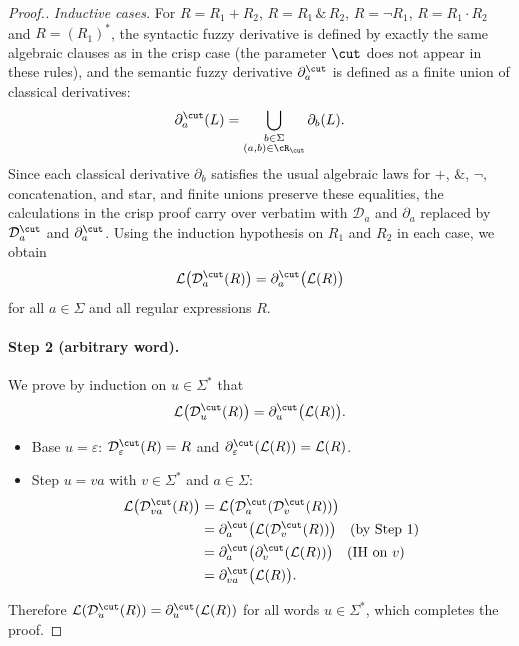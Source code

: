 \begin{proof}[Proof.]
\smallskip
\noindent\emph{Inductive cases.}
For $R = R_1 + R_2$, $R = R_1 \,\&\, R_2$, $R = \neg R_1$, $R = R_1\cdot R_2$ and
$R = (R_1)^*$, the syntactic fuzzy derivative is defined by exactly the same
algebraic clauses as in the crisp case (the parameter $\cut$ does not appear
in these rules), and the semantic fuzzy derivative $\partial^\cut_a$ is defined
as a finite union of classical derivatives:
\[
  \partial^\cut_a(L)
  = \bigcup_{\substack{b \in \Sigma \\ (a,b)\in\cR_\cut}} \partial_b(L).
\]
Since each classical derivative $\partial_b$ satisfies the usual algebraic
laws for $+$, $\&$, $\neg$, concatenation, and star, and finite unions preserve
these equalities, the calculations in the crisp proof carry over verbatim with
$\mathcal{D}_a$ and $\partial_a$ replaced by $\mathcal{D}^\cut_a$ and
$\partial^\cut_a$. Using the induction hypothesis on $R_1$ and $R_2$ in each
case, we obtain
\[
  \mathcal{L}\bigl(\mathcal{D}^\cut_a(R)\bigr)
  = \partial^\cut_a\bigl(\mathcal{L}(R)\bigr)
\]
for all $a \in \Sigma$ and all regular expressions $R$.

\paragraph{Step 2 (arbitrary word).}
We prove by induction on $u \in \Sigma^*$ that
\[
  \mathcal{L}\bigl(\mathcal{D}^\cut_u(R)\bigr)
  = \partial^\cut_u\bigl(\mathcal{L}(R)\bigr).
\]
\begin{itemize}
  \item Base $u=\varepsilon$:
    $\mathcal{D}^\cut_\varepsilon(R)=R$ and
    $\partial^\cut_\varepsilon(\mathcal{L}(R))=\mathcal{L}(R)$.
  \item Step $u = va$ with $v \in \Sigma^*$ and $a \in \Sigma$:
    \[
      \begin{aligned}
      \mathcal{L}\bigl(\mathcal{D}^\cut_{va}(R)\bigr)
      &= \mathcal{L}\bigl(\mathcal{D}^\cut_a(\mathcal{D}^\cut_v(R))\bigr) \\
      &= \partial^\cut_a\bigl(\mathcal{L}(\mathcal{D}^\cut_v(R))\bigr)
           \quad\text{(by Step 1)} \\
      &= \partial^\cut_a\bigl(\partial^\cut_v(\mathcal{L}(R))\bigr)
           \quad\text{(IH on $v$)} \\
      &= \partial^\cut_{va}\bigl(\mathcal{L}(R)\bigr).
      \end{aligned}
    \]
\end{itemize}
Therefore $\mathcal{L}(\mathcal{D}^\cut_u(R))=\partial^\cut_u(\mathcal{L}(R))$
for all words $u \in \Sigma^*$, which completes the proof.
\end{proof}


